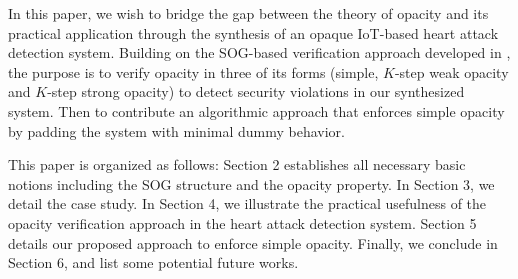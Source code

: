 In this paper, we wish to bridge the gap between the theory of opacity and its practical application through the synthesis of an opaque IoT-based heart attack detection system. Building on the SOG-based verification approach developed in \cite{bourouis2015checking}, the purpose is to verify opacity in three of its forms (simple, $K$-step weak opacity and $K$-step strong opacity) to detect security violations in our synthesized system. Then to contribute an algorithmic approach that enforces simple opacity by padding the system with minimal dummy behavior.

This paper is organized as follows: Section 2 establishes all necessary basic notions including the SOG structure and the opacity property. In Section 3, we detail the case study. In Section 4, we illustrate the practical usefulness of the opacity verification approach in the heart attack detection system. Section 5 details our proposed approach to enforce simple opacity. Finally, we conclude in Section 6, and list some potential future works. 
